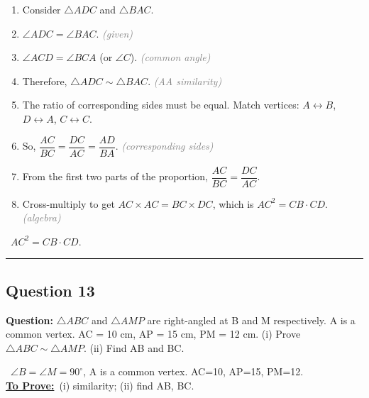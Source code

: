 \documentclass{article}
\newenvironment{steps}{%
  \begin{enumerate}[label=\textcolor{primary}{Step~\arabic*:}, leftmargin=*]
}{\end{enumerate}}
\newcommand{\sul}[1]{\uline{#1}}
\newcommand{\dul}[1]{\uuline{#1}}
\newcommand{\solutionheading}{{\raggedright\dul{\textbf{Solution}}\par}}
\newcommand{\given}[1]{\noindent\textbf{\textcolor{secondary}{\dul{Given:}}}~#1\\}
\newcommand{\toprove}[1]{\noindent\textbf{\textcolor{primary}{\sul{To Prove:}}}~#1\\}
\newcommand{\reason}[1]{\hfill\textit{\textcolor{gray}{(#1)}}}
\newcommand{\solutionrule}{\par\noindent\color{accent}\rule{\linewidth}{0.6pt}\par\smallskip}
\newcommand{\finalanswer}[1]{\noindent\textbf{\textcolor{accent}{\dul{Answer:}}}~#1\solutionrule}
\begin{document}
\begin{steps}
  \item Consider $\triangle ADC$ and $\triangle BAC$.
  \item $\angle ADC = \angle BAC$. \reason{given}
  \item $\angle ACD = \angle BCA$ (or $\angle C$). \reason{common angle}
  \item Therefore, $\triangle ADC \sim \triangle BAC$. \reason{AA similarity}
  \item The ratio of corresponding sides must be equal. Match vertices: $A \leftrightarrow B$, $D \leftrightarrow A$, $C \leftrightarrow C$.
  \item So, $\dfrac{AC}{BC}=\dfrac{DC}{AC}=\dfrac{AD}{BA}$. \reason{corresponding sides}
  \item From the first two parts of the proportion, $\dfrac{AC}{BC}=\dfrac{DC}{AC}$.
  \item Cross-multiply to get $AC \times AC = BC \times DC$, which is $AC^2=CB\cdot CD$. \reason{algebra}
\end{steps}

\finalanswer{$AC^2=CB\cdot CD$.}

\subsection*{Question 13}
\textbf{Question:} $\triangle ABC$ and $\triangle AMP$ are right-angled at B and M respectively. A is a common vertex. AC = 10 cm, AP = 15 cm, PM = 12 cm.
(i) Prove $\triangle ABC \sim \triangle AMP$. (ii) Find AB and BC.

\solutionheading
\given{$\angle B=\angle M=90^\circ$, A is a common vertex. AC=10, AP=15, PM=12.}
\toprove{(i) similarity; (ii) find AB, BC.}

\begin{center}
\end{center}
\end{document}
